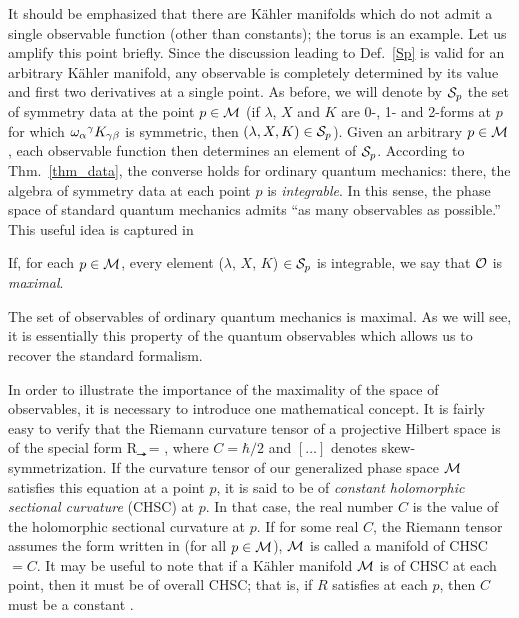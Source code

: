 It should be emphasized that there are K\"ahler manifolds which do not
admit a single observable function (other than constants); the torus
is an example.  Let us amplify this point briefly.  Since the
discussion leading to Def.~\ref{Sp} is valid for an arbitrary K\"ahler
manifold, any observable is completely determined by its value and
first two derivatives at a single point.  As before, we will denote by
${\cal S}_p$ the set of symmetry data at the point $p \in {\cal M} $ (if
$\lambda$, $X$ and $K$ are 0-, 1- and 2-forms at $p$ for which
$\omega_{\alpha}{}^{\gamma}K_{\gamma\beta}$ is symmetric, then $(\lambda, X, K) \in {\cal
S}_p$).  Given an arbitrary $p\in{\cal M}$, each observable function then
determines an element of ${\cal S}_p$.  According to
Thm.~\ref{thm_data}, the converse holds for ordinary quantum
mechanics: there, the algebra of symmetry data at each point $p$ is
{\em integrable}.  In this sense, the phase space of standard quantum
mechanics admits ``as many observables as possible.''  This useful
idea is captured in
%
\begin{definition}
If, for each $p \in {\cal M}$, every element ($\lambda$, $X$, $K$)
$\in {\cal S}_p$ is integrable, we say that ${\cal O}$ is
{\em maximal}.
\end{definition}
%
\noindent
The set of observables of ordinary quantum mechanics is maximal.  As
we will see, it is essentially this property of the quantum
observables which allows us to recover the standard formalism.

In order to illustrate the importance of the maximality of the space
of observables, it is necessary to introduce one mathematical concept.
It is fairly easy to verify that the Riemann curvature tensor of a
projective Hilbert space is of the special form
%
\be \label{chsc}
R_{\a\b\c\delta} =  ,
\ee
%
where $C = \hbar / 2$ and $[\ldots]$ denotes skew-symmetrization.  If
the curvature tensor of our generalized 
phase space ${\cal M}$ satisfies this equation at a point $p$, it is said to
be of {\em constant holomorphic sectional curvature} (CHSC) at $p$.
In that case, the real number $C$ is the value of the holomorphic
sectional curvature at $p$.  If for some real $C$, the Riemann tensor
assumes the form written in  (for all $p\in{\cal M}$), ${\cal M}$ is
called a manifold of CHSC$=C$.  It may be useful to note that if a
K\"ahler manifold ${\cal M}$ is of CHSC at each point, then it must be of
overall CHSC; that is, if $R$ satisfies  at each $p$, then
$C$ must be a constant \cite{yano}.


